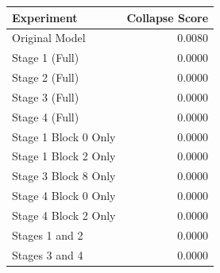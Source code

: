 \begin{tabular}{lr}
\toprule
Experiment & Collapse Score \\
\midrule
Original Model & 0.0080 \\
Stage 1 (Full) & 0.0000 \\
Stage 2 (Full) & 0.0000 \\
Stage 3 (Full) & 0.0000 \\
Stage 4 (Full) & 0.0000 \\
Stage 1 Block 0 Only & 0.0000 \\
Stage 1 Block 2 Only & 0.0000 \\
Stage 3 Block 8 Only & 0.0000 \\
Stage 4 Block 0 Only & 0.0000 \\
Stage 4 Block 2 Only & 0.0000 \\
Stages 1 and 2 & 0.0000 \\
Stages 3 and 4 & 0.0000 \\
\bottomrule
\end{tabular}
